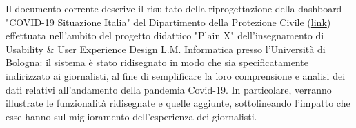 \documentclass[../../main.tex]{subfiles}
\begin{document}
\begin{executive}

    Il documento corrente descrive il risultato della riprogettazione della dashboard "COVID-19 Situazione Italia" del Dipartimento della Protezione Civile (\href{https://opendatadpc.maps.arcgis.com/apps/opsdashboard/index.html#/b0c68bce2cce478eaac82fe38d4138b1}{link}) effettuata nell'ambito del progetto didattico "Plain X" dell'insegnamento di Usability \& User Experience Design L.M. Informatica presso l'Università di Bologna: il sistema è stato ridisegnato in modo che sia specificatamente indirizzato ai giornalisti, al fine di semplificare la loro comprensione e analisi dei dati relativi all'andamento della pandemia Covid-19.
    In particolare, verranno illustrate le funzionalità ridisegnate e quelle aggiunte, sottolineando l'impatto che esse hanno sul miglioramento dell'esperienza dei giornalisti.

\end{executive}
\end{document}
